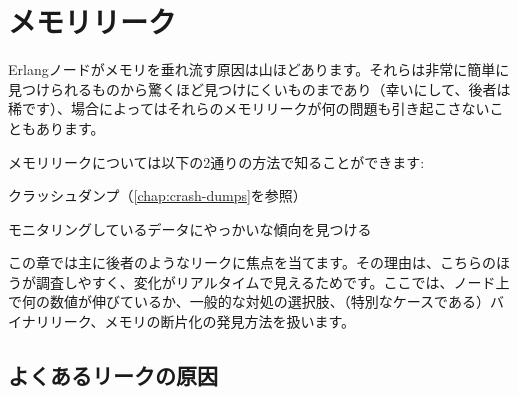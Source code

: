 \chapter{メモリリーク}
\label{chap:memory-leaks}

Erlangノードがメモリを垂れ流す原因は山ほどあります。それらは非常に簡単に見つけられるものから驚くほど見つけにくいものまであり（幸いにして、後者は稀です）、場合によってはそれらのメモリリークが何の問題も引き起こさないこともあります。

メモリリークについては以下の2通りの方法で知ることができます:

\begin{enumerate*}
	\item クラッシュダンプ（\ref{chap:crash-dumps}を参照）
	\item モニタリングしているデータにやっかいな傾向を見つける
\end{enumerate*}

この章では主に後者のようなリークに焦点を当てます。その理由は、こちらのほうが調査しやすく、変化がリアルタイムで見えるためです。ここでは、ノード上で何の数値が伸びているか、一般的な対処の選択肢、（特別なケースである）バイナリリーク、メモリの断片化の発見方法を扱います。

\section{よくあるリークの原因}

